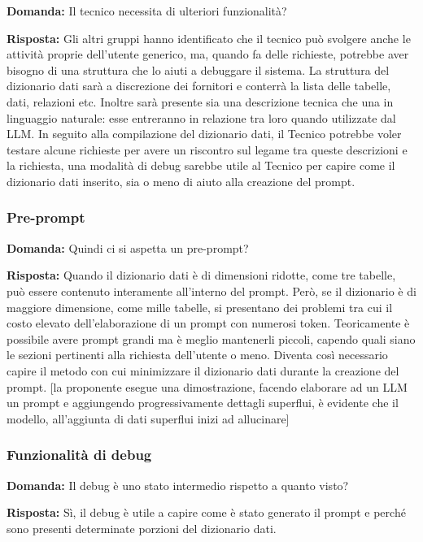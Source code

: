 \textbf{Domanda:} Il tecnico necessita di ulteriori funzionalità?

\textbf{Risposta:} Gli altri gruppi hanno identificato che il tecnico può svolgere anche le attività proprie dell’utente generico, ma, quando fa delle richieste, potrebbe aver bisogno di una struttura che lo aiuti a debuggare il sistema.
La struttura del dizionario dati sarà a discrezione dei fornitori e conterrà la lista delle tabelle, dati, relazioni etc. Inoltre sarà presente sia una descrizione tecnica che una in linguaggio naturale: esse entreranno in relazione tra loro quando utilizzate dal LLM. In seguito alla compilazione del dizionario dati, il Tecnico potrebbe voler testare alcune richieste per avere un riscontro sul legame tra queste descrizioni e la richiesta, una modalità di debug sarebbe utile al Tecnico per capire come il dizionario dati inserito, sia o meno di aiuto alla creazione del prompt.


\subsubsection{Pre-prompt}

\textbf{Domanda:} Quindi ci si aspetta un pre-prompt?

\textbf{Risposta:} Quando il dizionario dati è di dimensioni ridotte, come tre tabelle, può essere contenuto interamente all’interno del prompt. Però, se il dizionario è di maggiore dimensione, come mille tabelle, si presentano dei problemi tra cui il costo elevato dell’elaborazione di un prompt con numerosi token. Teoricamente è possibile avere prompt grandi ma è meglio mantenerli piccoli, capendo quali siano le sezioni pertinenti alla richiesta dell’utente o meno. Diventa così necessario capire il metodo con cui minimizzare il dizionario dati durante la creazione del prompt.
[la proponente esegue una dimostrazione, facendo elaborare ad un LLM un prompt e aggiungendo progressivamente dettagli superflui, è evidente che il modello, all’aggiunta di dati superflui inizi ad allucinare]

\subsubsection{Funzionalità di debug}

\textbf{Domanda:} Il debug è uno stato intermedio rispetto a quanto visto?

\textbf{Risposta:} Sì, il debug è utile a capire come è stato generato il prompt e perché sono presenti determinate porzioni del dizionario dati.


